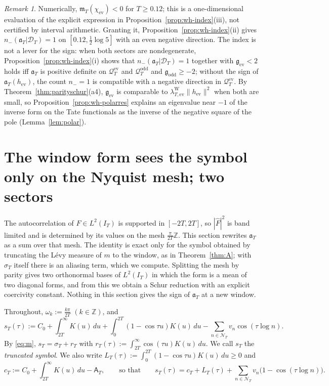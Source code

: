 \documentclass[11pt]{amsart}
\theoremstyle{definition}
\theoremstyle{remark}
\newtheorem{remark}[theorem]{Remark}
\newcommand{\Z}{\mathbb Z}
\newcommand{\IT}{I_T}
\newcommand{\sT}{\sigma_T}
\newcommand{\Fh}{\widehat F}
\newcommand{\NT}{\mathcal N_T}
\newcommand{\Aconst}{\mathsf A_T}
\newcommand{\mT}{\mathfrak m_T}
\begin{document}
\begin{remark}\label{rem:wh-index}
Numerically, $\mT(\chi_{\mathrm{ev}})<0$ for $T\ge0.12$; this is a one-dimensional evaluation of the explicit
expression in Proposition~\ref{prop:wh-index}(iii), not certified by interval arithmetic. Granting it,
Proposition~\ref{prop:wh-index}(ii) gives $n_-(\mathfrak a_T|\mathcal D_T)=1$ on $[0.12,\frac12\log5]$ with an even negative
direction. The index is not a lever for the sign: when both sectors are nondegenerate,
Proposition~\ref{prop:wh-index}(i) shows that $n_-(\mathfrak a_T|\mathcal D_T)=1$ together with $\mathfrak g_{\mathrm{ev}}<2$ holds iff
$\mathfrak a_T$ is positive definite on $\mathcal Q^{\mathrm{ev}}_T$ and $\mathcal Q^{\mathrm{odd}}_T$ and $\mathfrak g_{\mathrm{odd}}\ge-2$; without the
sign of $\mathfrak a_T(h_{\mathrm{ev}})$, the count $n_-=1$ is compatible with a negative direction in $\mathcal Q^{\mathrm{ev}}_T$. By
Theorem~\ref{thm:parityschur}(a4), $\mathfrak g_{\mathrm{ev}}$ is comparable to $\lambda^{\mathrm W}_{T,\mathrm{ev}}\|h_{\mathrm{ev}}\|^2$ when both
are small, so Proposition~\ref{prop:wh-polarres} explains an eigenvalue near $-1$ of the inverse form on the
Tate functionals as the inverse of the negative square of the pole (Lemma~\ref{lem:polar}).
\end{remark}


\section{The window form sees the symbol only on the Nyquist mesh; two sectors}\label{sec:nyq}

The autocorrelation of $F\in L^2(\IT)$ is supported in $[-2T,2T]$, so $|\Fh|^2$ is band limited and is
determined by its values on the mesh $\frac{\pi}{2T}\Z$. This section rewrites $\mathfrak a_T$ as a sum over
that mesh. The identity is exact only for the symbol obtained by truncating the L\'evy measure of $m$ to the
window, as in Theorem~\ref{thm:A}; with $\sT$ itself there is an aliasing term, which we compute. Splitting the
mesh by parity gives two orthonormal bases of $L^2(\IT)$ in which the form is a mean of two diagonal forms,
and from this we obtain a Schur reduction with an explicit coercivity constant. Nothing in this section gives
the sign of $\mathfrak a_T$ at a new window.

Throughout, $\omega_k:=\frac{k\pi}{2T}$ $(k\in\Z)$, and
\begin{equation}\label{eq:nyq-sT}
s_T(\tau):=C_0+\int_{2T}^\infty K(u)\,du+\int_0^{2T}(1-\cos\tau u)K(u)\,du-\sum_{n\in\NT}v_n\cos(\tau\log n).
\end{equation}
By \eqref{eq:m}, $s_T=\sT+r_T$ with $r_T(\tau):=\int_{2T}^\infty\cos(\tau u)K(u)\,du$. We call $s_T$ the
\emph{truncated symbol}. We also write $L_T(\tau):=\int_0^{2T}(1-\cos\tau u)K(u)\,du\ge0$ and
\[
c_T:=C_0+\int_{2T}^\infty K(u)\,du-\Aconst,\qquad\text{so that}\qquad
s_T(\tau)=c_T+L_T(\tau)+\sum_{n\in\NT}v_n\big(1-\cos(\tau\log n)\big).
\]
\end{document}
